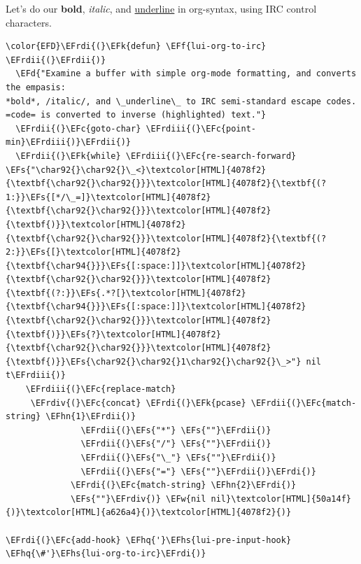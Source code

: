\documentclass{scrartcl}
\newcommand{\EFk}[1]{\textcolor{EFk}{#1}} %
\newcommand{\EFd}[1]{\textcolor{EFd}{\textit{#1}}} %
\newcommand{\EFs}[1]{\textcolor{EFs}{#1}} %
\newcommand{\EFw}[1]{\textcolor{EFw}{#1}} %
\newcommand{\EFc}[1]{\textcolor{EFc}{#1}} %
\newcommand{\EFf}[1]{\textcolor{EFf}{#1}} %
\newcommand{\EFhn}[1]{\textcolor{EFhn}{\textbf{#1}}} %
\newcommand{\EFhq}[1]{\textcolor{EFhq}{#1}} %
\newcommand{\EFhs}[1]{\textcolor{EFhs}{#1}} %
\newcommand{\EFrdi}[1]{\textcolor{EFrdi}{#1}} %
\newcommand{\EFrdii}[1]{\textcolor{EFrdii}{#1}} %
\newcommand{\EFrdiii}[1]{\textcolor{EFrdiii}{#1}} %
\newcommand{\EFrdiv}[1]{\textcolor{EFrdiv}{#1}} %
\begin{document}
Let's do our \textbf{bold}, \emph{italic}, and \uline{underline} in org-syntax, using IRC control characters.
\begin{Code}
\begin{Verbatim}[]
\color{EFD}\EFrdi{(}\EFk{defun} \EFf{lui-org-to-irc} \EFrdii{(}\EFrdii{)}
  \EFd{"Examine a buffer with simple org-mode formatting, and converts the empasis:
*bold*, /italic/, and \_underline\_ to IRC semi-standard escape codes.
=code= is converted to inverse (highlighted) text."}
  \EFrdii{(}\EFc{goto-char} \EFrdiii{(}\EFc{point-min}\EFrdiii{)}\EFrdii{)}
  \EFrdii{(}\EFk{while} \EFrdiii{(}\EFc{re-search-forward} \EFs{"\char92{}\char92{}\_<}\textcolor[HTML]{4078f2}{\textbf{\char92{}\char92{}}}\textcolor[HTML]{4078f2}{\textbf{(?1:}}\EFs{[*/\_=]}\textcolor[HTML]{4078f2}{\textbf{\char92{}\char92{}}}\textcolor[HTML]{4078f2}{\textbf{)}}\textcolor[HTML]{4078f2}{\textbf{\char92{}\char92{}}}\textcolor[HTML]{4078f2}{\textbf{(?2:}}\EFs{[}\textcolor[HTML]{4078f2}{\textbf{\char94{}}}\EFs{[:space:]]}\textcolor[HTML]{4078f2}{\textbf{\char92{}\char92{}}}\textcolor[HTML]{4078f2}{\textbf{(?:}}\EFs{.*?[}\textcolor[HTML]{4078f2}{\textbf{\char94{}}}\EFs{[:space:]]}\textcolor[HTML]{4078f2}{\textbf{\char92{}\char92{}}}\textcolor[HTML]{4078f2}{\textbf{)}}\EFs{?}\textcolor[HTML]{4078f2}{\textbf{\char92{}\char92{}}}\textcolor[HTML]{4078f2}{\textbf{)}}\EFs{\char92{}\char92{}1\char92{}\char92{}\_>"} nil t\EFrdiii{)}
    \EFrdiii{(}\EFc{replace-match}
     \EFrdiv{(}\EFc{concat} \EFrdi{(}\EFk{pcase} \EFrdii{(}\EFc{match-string} \EFhn{1}\EFrdii{)}
               \EFrdii{(}\EFs{"*"} \EFs{""}\EFrdii{)}
               \EFrdii{(}\EFs{"/"} \EFs{""}\EFrdii{)}
               \EFrdii{(}\EFs{"\_"} \EFs{""}\EFrdii{)}
               \EFrdii{(}\EFs{"="} \EFs{""}\EFrdii{)}\EFrdi{)}
             \EFrdi{(}\EFc{match-string} \EFhn{2}\EFrdi{)}
             \EFs{""}\EFrdiv{)} \EFw{nil nil}\textcolor[HTML]{50a14f}{)}\textcolor[HTML]{a626a4}{)}\textcolor[HTML]{4078f2}{)}

\EFrdi{(}\EFc{add-hook} \EFhq{'}\EFhs{lui-pre-input-hook} \EFhq{\#'}\EFhs{lui-org-to-irc}\EFrdi{)}
\end{Verbatim}
\end{Code}
\end{document}
